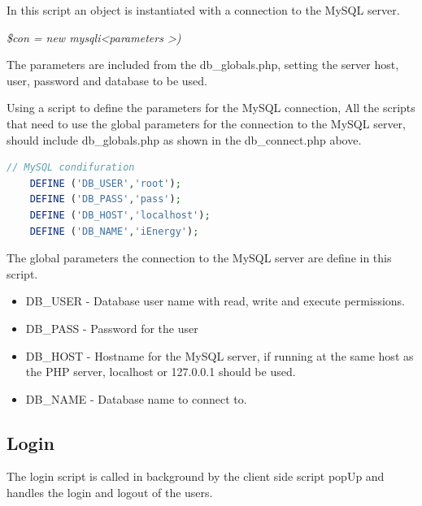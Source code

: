 In this script an object is instantiated with a connection to the MySQL server.

\textit{\$con = new mysqli\textless parameters \textgreater)}

The parameters are included from the db\_globals.php, setting the server host, user, password and database to be used.


Using a script to define the parameters for the MySQL connection, 
All the scripts that need to use the global parameters for the connection to the MySQL server, should include db\_globals.php as shown in the db\_connect.php above.

\begin{lstlisting}[language=php]
	// MySQL condifuration
	DEFINE ('DB_USER','root');
	DEFINE ('DB_PASS','pass');
	DEFINE ('DB_HOST','localhost');
	DEFINE ('DB_NAME','iEnergy');
\end{lstlisting}

The global parameters the connection to the MySQL server are define in this script.

\begin{itemize}
	\item DB\_USER - Database user name with read, write and execute permissions.
	\item DB\_PASS - Password for the user
	\item DB\_HOST - Hostname for the MySQL server, if running at the same host as the PHP server, localhost or 127.0.0.1 should be used.
	\item DB\_NAME - Database name to connect to.
\end{itemize}

\subsection{Login}
The login script is called in background by the client side script popUp and handles the login and logout of the users.

